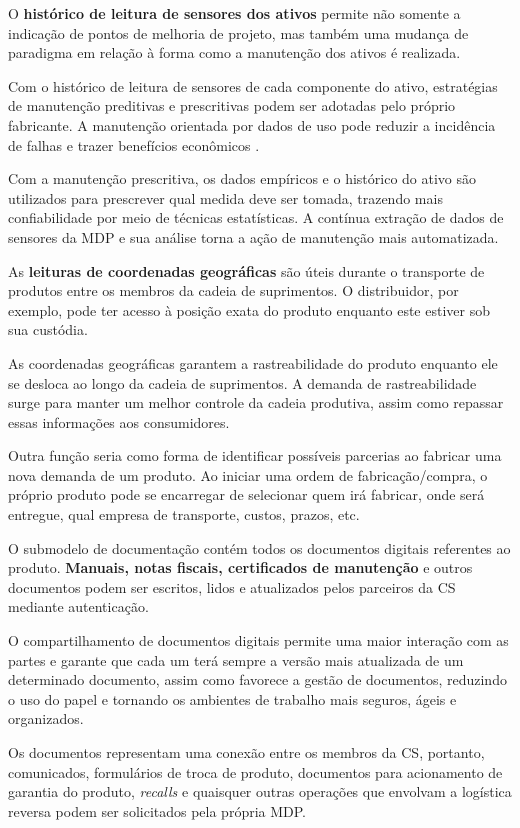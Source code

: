 	O \textbf{histórico de leitura de sensores dos ativos} permite não somente a indicação de pontos de melhoria de projeto, mas também uma mudança de paradigma em relação à forma como a manutenção dos ativos é realizada.
	
	Com o histórico de leitura de sensores de cada componente do ativo, estratégias de manutenção preditivas e prescritivas podem ser adotadas pelo próprio fabricante. A manutenção orientada por dados de uso pode reduzir a incidência de falhas e trazer benefícios econômicos \cite{odonovan2015maintenance}.
	
	Com a manutenção prescritiva, os dados empíricos e o histórico do ativo são utilizados para prescrever qual medida deve ser tomada, trazendo mais confiabilidade por meio de técnicas estatísticas. A contínua extração de dados de sensores da MDP e sua análise torna a ação de manutenção mais automatizada.
	
	As \textbf{leituras de coordenadas geográficas} são úteis durante o transporte de produtos entre os membros da cadeia de suprimentos. O distribuidor, por exemplo, pode ter acesso à posição exata do produto enquanto este estiver sob sua custódia.
	
	As coordenadas geográficas garantem a rastreabilidade do produto enquanto ele se desloca ao longo da cadeia de suprimentos. A demanda de rastreabilidade surge para manter um melhor controle da cadeia produtiva, assim como repassar essas informações aos consumidores.
	
	Outra função seria como forma de identificar possíveis parcerias ao fabricar uma nova demanda de um produto. Ao iniciar uma ordem de fabricação/compra, o próprio produto pode se encarregar de selecionar quem irá fabricar, onde será entregue, qual empresa de transporte, custos, prazos, etc.
	
	O submodelo de documentação contém todos os documentos digitais referentes ao produto. \textbf{Manuais, notas fiscais, certificados de manutenção} e outros documentos podem ser escritos, lidos e atualizados pelos parceiros da CS mediante autenticação.
	
	O compartilhamento de documentos digitais permite uma maior interação com as partes e garante que cada um terá sempre a versão mais atualizada de um determinado documento, assim como favorece a gestão de documentos, reduzindo o uso do papel e tornando os ambientes de trabalho mais seguros, ágeis e organizados.
	
	Os documentos representam uma conexão entre os membros da CS, portanto, comunicados, formulários de troca de produto, documentos para acionamento de garantia do produto, \textit{recalls} e quaisquer outras operações que envolvam a logística reversa podem ser solicitados pela própria MDP.
